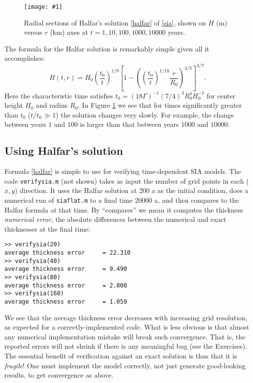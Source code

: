 \documentclass[letterpaper,final,12pt,reqno]{amsart}
\newcommand{\onefigsize}[3]{
\begin{figure}[ht]
\centering
\texttt{[image: \#1]}
\caption{#2}
\label{fig:#1}
\end{figure}}
\begin{document}
\onefigsize{siascaling}{Radial sections of Halfar's solution \eqref{halfar} of \eqref{sia}, shown on $H$ (m) versus $r$ (km) axes at $t=1,10,100,1000,10000$ years.}{5.5in}

The formula for the Halfar solution is remarkably simple given all it accomplishes:
\begin{equation}
H(t,r) = H_0 \left(\frac{t_0}{t}\right)^{1/9} \left[1 - \left(\left(\frac{t_0}{t}\right)^{1/18} \frac{r}{R_0}\right)^{4/3}\right]^{3/7}. \label{halfar}
\end{equation}
Here the characteristic time satisfies $t_0 = (18 \Gamma)^{-1} (7/4)^3 R_0^4 H_0^{-7}$ for center height $H_0$ and radius $R_0$.  In Figure \ref{fig:siascaling} we see that for times significantly greater than $t_0$ ($t/t_0 \gg 1$) the solution changes very slowly.  For example, the change between years $1$ and $100$ is larger than that between years $1000$ and $10000$.

\subsection*{Using Halfar's solution}  Formula \eqref{halfar} is simple to use for verifying time-dependent SIA models.  The code \texttt{verifysia.m} (not shown) takes as input the number of grid points in each ($x,y$) direction.  It uses the Halfar solution at 200 a as the initial condition, does a numerical run of \texttt{siaflat.m} to a final time 20000 a, and then compares to the Halfar formula at that time.  By ``compares'' we mean it computes the thickness \emph{numerical error}, the absolute differences between the numerical and exact thicknesses at the final time:
\small
\begin{verbatim}
>> verifysia(20)
average thickness error     = 22.310
>> verifysia(40)
average thickness error     = 9.490
>> verifysia(80)
average thickness error     = 2.800
>> verifysia(160)
average thickness error     = 1.059
\end{verbatim}
\normalsize
We see that the average thickness error decreases with increasing grid resolution, as expected for a correctly-implemented code.  What is less obvious is that almost any numerical implementation mistake will break such convergence.  That is, the reported errors will not shrink if there is any meaningful bug (see the Exercises).  The essential benefit of verification against an exact solution is thus that it is \emph{fragile}!  One must implement the model correctly, not just generate good-looking results, to get convergence as above.
\end{document}
